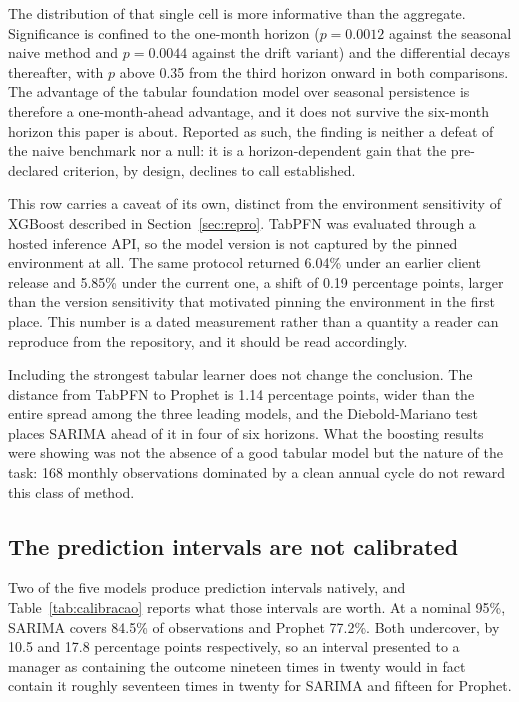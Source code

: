 The distribution of that single cell is more informative than the aggregate. Significance
is confined to the one-month horizon ($p=0.0012$ against the seasonal naive method and
$p=0.0044$ against the drift variant) and the differential decays thereafter, with $p$
above 0.35 from the third horizon onward in both comparisons. The advantage of the tabular
foundation model over seasonal persistence is therefore a one-month-ahead advantage, and it
does not survive the six-month horizon this paper is about. Reported as such, the finding is
neither a defeat of the naive benchmark nor a null: it is a horizon-dependent gain that the
pre-declared criterion, by design, declines to call established.

This row carries a caveat of its own, distinct from the environment sensitivity of
XGBoost described in Section~\ref{sec:repro}. TabPFN was evaluated through a hosted
inference API, so the model version is not captured by the pinned environment at all. The same protocol returned 6.04\% under an earlier client
release and 5.85\% under the current one, a shift of 0.19 percentage points, larger than the
version sensitivity that motivated pinning the environment in the first place. This number
is a dated measurement rather than a quantity a reader can reproduce from the repository,
and it should be read accordingly.

Including the strongest tabular learner does not change the conclusion. The
distance from TabPFN to Prophet is 1.14 percentage points, wider than the entire spread
among the three leading models, and the Diebold-Mariano test places SARIMA ahead of it in
four of six horizons. What the boosting results were showing was not the absence
of a good tabular model but the nature of the task: 168 monthly observations dominated by a
clean annual cycle do not reward this class of method.

\subsection{The prediction intervals are not calibrated}



Two of the five models produce prediction intervals natively, and Table~\ref{tab:calibracao}
reports what those intervals are worth. At a nominal 95\%, SARIMA covers 84.5\% of
observations and Prophet 77.2\%. Both undercover, by 10.5 and 17.8 percentage points
respectively, so an interval presented to a manager as containing the outcome nineteen times
in twenty would in fact contain it roughly seventeen times in twenty for SARIMA and fifteen
for Prophet.


